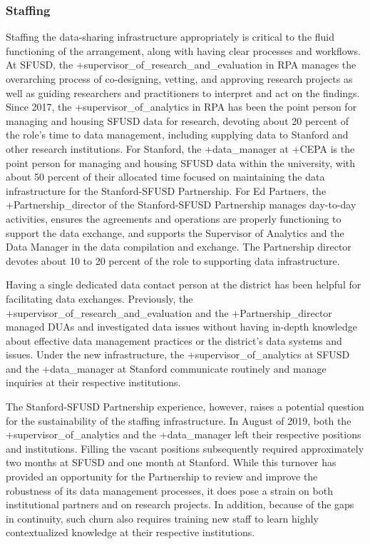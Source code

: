 \documentclass[
]{book}
\begin{document}
\hypertarget{staffing}{%
\subsubsection{Staffing}\label{staffing}}

Staffing the data-sharing infrastructure appropriately is critical to the fluid functioning of the arrangement, along with having clear processes and workflows. At SFUSD, the +supervisor\_of\_research\_and\_evaluation\textbar{} in RPA manages the overarching process of co-designing, vetting, and approving research projects as well as guiding researchers and practitioners to interpret and act on the findings. Since 2017, the +supervisor\_of\_analytics\textbar{} in RPA has been the point person for managing and housing SFUSD data for research, devoting about 20 percent of the role's time to data management, including supplying data to Stanford and other research institutions. For Stanford, the +data\_manager\textbar{} at +CEPA\textbar{} is the point person for managing and housing SFUSD data within the university, with about 50 percent of their allocated time focused on maintaining the data infrastructure for the Stanford-SFUSD Partnership. For Ed Partners, the +Partnership\_director\textbar{} of the Stanford-SFUSD Partnership manages day-to-day activities, ensures the agreements and operations are properly functioning to support the data exchange, and supports the Supervisor of Analytics and the Data Manager in the data compilation and exchange. The Partnership director devotes about 10 to 20 percent of the role to supporting data infrastructure.

Having a single dedicated data contact person at the district has been helpful for facilitating data exchanges. Previously, the +supervisor\_of\_research\_and\_evaluation\textbar{} and the +Partnership\_director\textbar{} managed DUAs and investigated data issues without having in-depth knowledge about effective data management practices or the district's data systems and issues. Under the new infrastructure, the +supervisor\_of\_analytics\textbar{} at SFUSD and the +data\_manager\textbar{} at Stanford communicate routinely and manage inquiries at their respective institutions.

The Stanford-SFUSD Partnership experience, however, raises a potential question for the sustainability of the staffing infrastructure. In August of 2019, both the +supervisor\_of\_analytics\textbar{} and the +data\_manager\textbar{} left their respective positions and institutions. Filling the vacant positions subsequently required approximately two months at SFUSD and one month at Stanford. While this turnover has provided an opportunity for the Partnership to review and improve the robustness of its data management processes, it does pose a strain on both institutional partners and on research projects. In addition, because of the gaps in continuity, such churn also requires training new staff to learn highly contextualized knowledge at their respective institutions.
\end{document}
